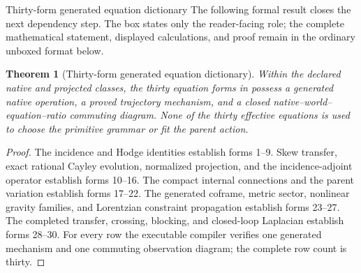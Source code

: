 \documentclass[11pt]{article}
\numberwithin{equation}{section}
\newtheorem{theorem}[definition]{Theorem}
\theoremstyle{remark}
\begin{document}
\begin{proofguide}{Thirty-form generated equation dictionary}
The following formal result closes the next dependency step. The box states only the reader-facing role; the complete mathematical statement, displayed calculations, and proof remain in the ordinary unboxed format below.
\end{proofguide}
\begin{theorem}[Thirty-form generated equation dictionary]
Within the declared native and projected classes, the thirty equation forms in  possess a generated native operation, a proved trajectory mechanism, and a closed native--world--equation--ratio commuting diagram. None of the thirty effective equations is used to choose the primitive grammar or fit the parent action.
\end{theorem}
\begin{proof}
The incidence and Hodge identities establish forms 1--9. Skew transfer, exact rational Cayley evolution, normalized projection, and the incidence-adjoint operator establish forms 10--16. The compact internal connections and the parent variation establish forms 17--22. The generated coframe, metric sector, nonlinear gravity families, and Lorentzian constraint propagation establish forms 23--27. The completed transfer, crossing, blocking, and closed-loop Laplacian establish forms 28--30. For every row the executable compiler verifies one generated mechanism and one commuting observation diagram; the complete row count is thirty.
\end{proof}
\end{document}
